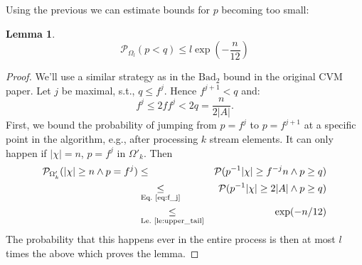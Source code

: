 \documentclass{article}
\newcommand{\prob}{\mathcal P}
\theoremstyle{definition}
\newtheorem{lemma}{Lemma}
\begin{document}
Using the previous we can estimate bounds for $p$ becoming too small:
\begin{lemma}\label{le:low_p}
\[
\prob_{\Omega_l}(p < q) \leq l \exp\left( - \frac{n}{12}\right)
\]
\end{lemma}
\begin{proof}
We'll use a similar strategy as in the $\mathrm{Bad}_2$ bound in the original CVM paper.
Let $j$ be maximal, s.t., $q \leq f^j$. Hence $f^{j+1} < q$ and:
\begin{equation}
\label{eq:f_j}
  f^j \leq 2f f^j < 2q = \frac{n}{2|A|} \textrm{.}
\end{equation}
First, we bound the probability of jumping from $p=f^j$ to $p=f^{j+1}$ at a specific point in the algorithm, e.g., after processing $k$ stream elements.
It can only happen if $|\chi|=n$, $p=f^j$ in $\Omega'_k$. Then
\begin{eqnarray*}
  \prob_{\Omega'_k} ( |\chi| \geq n \wedge p=f^j) & \leq & \prob( p^{-1} |\chi| \geq f^{-j} n \wedge p \geq q) \\
    & \underset{\textrm{Eq.~\ref{eq:f_j}}}{\leq} & \prob( p^{-1} |\chi| \geq 2|A| \wedge p \geq q ) \\
    & \underset{\textrm{Le.~\ref{le:upper_tail}}}{\leq} & \exp(- n/12)
\end{eqnarray*}
The probability that this happens ever in the entire process is then at most $l$ times the above which proves the lemma.
\end{proof}
\end{document}

